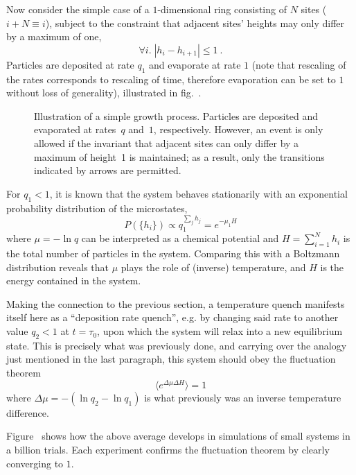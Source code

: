 Now consider the simple case of a \(1\)-dimensional ring consisting of \(N\) sites (\(i+N \equiv i\)), subject to the constraint that adjacent sites' heights may only differ by a maximum of one,
%
\begin{equation}
	\forall i.\; |h_i - h_{i+1}| \leq 1 ~.
\end{equation}
%
Particles are deposited at rate \(q_1\) and evaporate at rate \(1\) (note that rescaling of the rates corresponds to rescaling of time, therefore evaporation can be set to \(1\) without loss of generality), illustrated in fig.~.
%
\begin{figure}[htbp]
	\centering
	
	\caption[]{Illustration of a simple growth process. Particles are {\color{blue}deposited} and {\color{red}evaporated} at rates~{\color{blue}\(q\)} and~{\color{red}\(1\)}, respectively. However, an event is only allowed if the invariant that adjacent sites can only differ by a maximum of height~1 is maintained; as a result, only the transitions indicated by arrows are permitted.}
	\label{fig:growth process schema}
\end{figure}
%
For \(q_1 < 1\), it is known that the system behaves stationarily with an exponential probability distribution of the microstates,
%
\begin{equation}
	P(\{h_i\}) \propto q_1^{\sum_jh_j} = e^{-\mu_1 H}
\end{equation}
%
where \(\mu = -\ln q\) can be interpreted as a chemical potential and \(H = \sum_{i=1}^Nh_i\) is the total number of particles in the system. Comparing this with a Boltzmann distribution reveals that \(\mu\) plays the role of (inverse) temperature, and \(H\) is the energy contained in the system.

Making the connection to the previous section, a temperature quench manifests itself here as a ``deposition rate quench'', e.g. by changing said rate to another value \(q_2 < 1\) at \(t = \tau_0\), upon which the system will relax into a new equilibrium state. This is precisely what was previously done, and carrying over the analogy just mentioned in the last paragraph, this system should obey the fluctuation theorem
%
\begin{equation}
	\langle e^{\Delta\mu\Delta H}\rangle = 1
\end{equation}
%
where \(\Delta\mu = -(\ln q_2-\ln q_1)\) is what previously was an inverse temperature difference.

Figure~ shows how the above average develops in simulations of small systems in a billion trials. Each experiment confirms the fluctuation theorem by clearly converging to \(1\).

